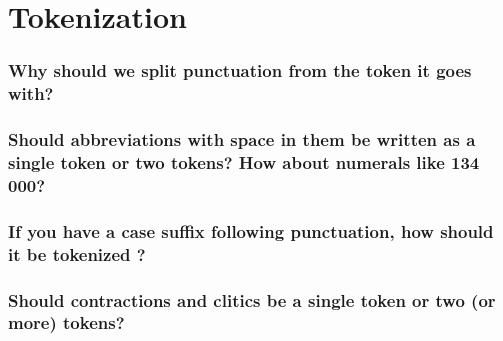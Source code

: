 \documentclass[fleqn]{article}
\begin{document}
\section{Tokenization}
\subsubsection{Why should we split punctuation from the token it goes with?}

\subsubsection{Should abbreviations with space in them be written as a single token or two tokens? How about numerals like 134 000?}

\subsubsection{If you have a case suffix following punctuation, how should it be tokenized ?}

\subsubsection{Should contractions and clitics be a single token or two (or more) tokens?}
\end{document}
